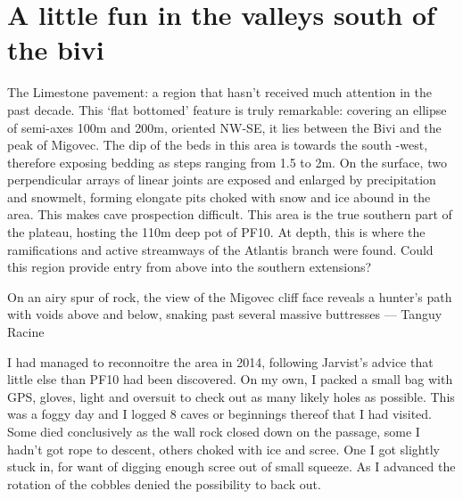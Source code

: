 \section{A little fun in the valleys south of the bivi}

\begin{marginfigure}
\end{marginfigure}

The Limestone pavement: a region that hasn’t received much attention in the past decade. This ‘flat bottomed’ feature is truly remarkable: covering an ellipse of semi-axes 100m and 200m, oriented NW-SE, it lies between the Bivi and the peak of Migovec. The dip of the beds in this area is towards the south -west, therefore exposing bedding as steps ranging from 1.5 to 2m. On the surface, two perpendicular arrays of linear joints are exposed and enlarged by precipitation and snowmelt, forming elongate pits choked with snow and ice abound in the area. This makes cave prospection difficult. This area is the true southern part of the plateau, hosting the 110m deep pot of PF10.  At depth, this is where the ramifications and active streamways of the Atlantis branch were found. Could this region provide entry from above into the southern extensions?

\begin{marginfigure}
\centering
{}
\label{migface}
\caption{On an airy spur of rock, the view of the Migovec cliff face reveals a hunter's path with voids above and below, snaking past several massive buttresses --- Tanguy Racine}
\end{marginfigure}

I had managed to reconnoitre the area in 2014, following Jarvist’s advice that little else than PF10 had been discovered. On my own, I packed a small bag with GPS, gloves, light and oversuit to check out as many likely holes as possible. This was a foggy day and I logged 8 caves or beginnings thereof that I had visited. Some died conclusively as the wall rock closed down on the passage, some I hadn’t got rope to descent, others choked with ice and scree. One I got slightly stuck in, for want of digging enough scree out of small squeeze. As I advanced the rotation of the cobbles denied the possibility to back out. 

